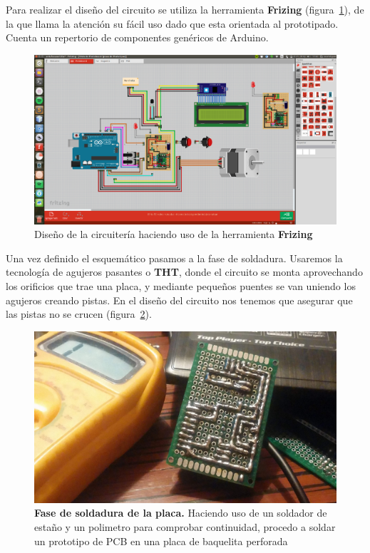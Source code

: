 \begin{itemize}
Para realizar el diseño del circuito se utiliza la herramienta \textbf{Frizing} \cite{frizing} (figura~\ref{fig:fritzing}), de la que llama la atención su fácil uso dado que esta orientada al prototipado. Cuenta un repertorio de componentes genéricos de Arduino.

\begin{figure}[h]
	\centering
	\includegraphics[width=1\linewidth]{../images/frizing}
	\caption[Diseño circuito con Frizing]{Diseño de la circuitería haciendo uso de la herramienta \textbf{Frizing}}
	\label{fig:fritzing}
\end{figure}

Una vez definido el esquemático pasamos a la fase de soldadura. Usaremos la tecnología de agujeros pasantes o \textbf{THT}, donde el circuito se monta aprovechando los orificios que trae una placa, y mediante pequeños puentes se van uniendo los agujeros creando pistas. En el diseño del circuito nos tenemos que asegurar que las pistas no se crucen (figura~\ref{fig:prototipoAgujeros}).  

\begin{figure}
	\centering
	\includegraphics[width=1\linewidth]{../images/circuito01}
	\caption[Fase de soldadura de la placa]{\textbf{Fase de soldadura de la placa.} Haciendo uso de un soldador de estaño y un polimetro para comprobar continuidad, procedo a soldar un prototipo de PCB en una placa de baquelita perforada}
	\label{fig:prototipoAgujeros}
\end{figure}




\end{itemize}
